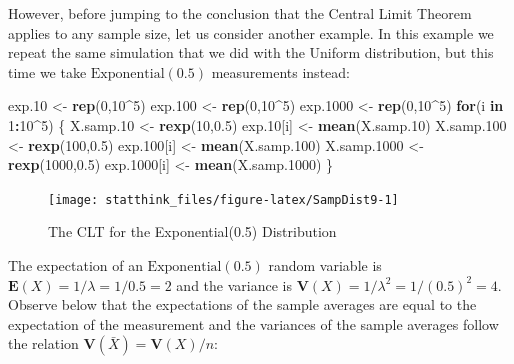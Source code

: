 \documentclass[
]{krantz}
\makeatletter
\newenvironment{Shaded}{\begin{snugshade}}{\end{snugshade}}
\newcommand{\ControlFlowTok}[1]{\textcolor[rgb]{0.13,0.29,0.53}{\textbf{#1}}}
\newcommand{\DecValTok}[1]{\textcolor[rgb]{0.00,0.00,0.81}{#1}}
\newcommand{\FloatTok}[1]{\textcolor[rgb]{0.00,0.00,0.81}{#1}}
\newcommand{\KeywordTok}[1]{\textcolor[rgb]{0.13,0.29,0.53}{\textbf{#1}}}
\newcommand{\NormalTok}[1]{#1}
\newcommand{\OperatorTok}[1]{\textcolor[rgb]{0.81,0.36,0.00}{\textbf{#1}}}
\newcommand{\StringTok}[1]{\textcolor[rgb]{0.31,0.60,0.02}{#1}}
\newcommand{\Expec}{\mathbf{E}}
\newcommand{\Var}{\mathbf{V}}
\newenvironment{kframe}{%
\medskip{}
\setlength{\fboxsep}{.8em}
 \def\at@end@of@kframe{}%
 \ifinner\ifhmode%
  \def\at@end@of@kframe{\end{minipage}}%
  \begin{minipage}{\columnwidth}%
 \fi\fi%
 \def\FrameCommand##1{\hskip\@totalleftmargin \hskip-\fboxsep
 \colorbox{shadecolor}{##1}\hskip-\fboxsep
     \hskip-\linewidth \hskip-\@totalleftmargin \hskip\columnwidth}%
 \MakeFramed {\advance\hsize-\width
   \@totalleftmargin\z@ \linewidth\hsize
   \@setminipage}}%
 {\par\unskip\endMakeFramed%
 \at@end@of@kframe}
\renewenvironment{Shaded}{\begin{kframe}}{\end{kframe}}
\theoremstyle{definition}
\theoremstyle{definition}
\theoremstyle{definition}
\theoremstyle{remark}
\makeatother
\begin{document}
However, before jumping to the conclusion that the Central Limit Theorem
applies to any sample size, let us consider another example. In this
example we repeat the same simulation that we did with the Uniform
distribution, but this time we take \(\mathrm{Exponential}(0.5)\)
measurements instead:

\begin{Shaded}
\begin{Highlighting}[]
\NormalTok{exp}\FloatTok{.10}\NormalTok{ <-}\StringTok{ }\KeywordTok{rep}\NormalTok{(}\DecValTok{0}\NormalTok{,}\DecValTok{10}\OperatorTok{^}\DecValTok{5}\NormalTok{)}
\NormalTok{exp}\FloatTok{.100}\NormalTok{ <-}\StringTok{ }\KeywordTok{rep}\NormalTok{(}\DecValTok{0}\NormalTok{,}\DecValTok{10}\OperatorTok{^}\DecValTok{5}\NormalTok{)}
\NormalTok{exp}\FloatTok{.1000}\NormalTok{ <-}\StringTok{ }\KeywordTok{rep}\NormalTok{(}\DecValTok{0}\NormalTok{,}\DecValTok{10}\OperatorTok{^}\DecValTok{5}\NormalTok{)}
\ControlFlowTok{for}\NormalTok{(i }\ControlFlowTok{in} \DecValTok{1}\OperatorTok{:}\DecValTok{10}\OperatorTok{^}\DecValTok{5}\NormalTok{) \{}
\NormalTok{  X.samp}\FloatTok{.10}\NormalTok{ <-}\StringTok{ }\KeywordTok{rexp}\NormalTok{(}\DecValTok{10}\NormalTok{,}\FloatTok{0.5}\NormalTok{)}
\NormalTok{  exp}\FloatTok{.10}\NormalTok{[i] <-}\StringTok{ }\KeywordTok{mean}\NormalTok{(X.samp}\FloatTok{.10}\NormalTok{)}
\NormalTok{  X.samp}\FloatTok{.100}\NormalTok{ <-}\StringTok{ }\KeywordTok{rexp}\NormalTok{(}\DecValTok{100}\NormalTok{,}\FloatTok{0.5}\NormalTok{)}
\NormalTok{  exp}\FloatTok{.100}\NormalTok{[i] <-}\StringTok{ }\KeywordTok{mean}\NormalTok{(X.samp}\FloatTok{.100}\NormalTok{)}
\NormalTok{  X.samp}\FloatTok{.1000}\NormalTok{ <-}\StringTok{ }\KeywordTok{rexp}\NormalTok{(}\DecValTok{1000}\NormalTok{,}\FloatTok{0.5}\NormalTok{)}
\NormalTok{  exp}\FloatTok{.1000}\NormalTok{[i] <-}\StringTok{ }\KeywordTok{mean}\NormalTok{(X.samp}\FloatTok{.1000}\NormalTok{)}
\NormalTok{\}}
\end{Highlighting}
\end{Shaded}

\begin{figure}

{\centering \texttt{[image: statthink\_files/figure-latex/SampDist9-1]} 

}

\caption{The CLT for the Exponential(0.5) Distribution}\label{fig:SampDist9}
\end{figure}

The expectation of an \(\mathrm{Exponential}(0.5)\) random variable is
\(\Expec(X) = 1/\lambda = 1/0.5 = 2\) and the variance is
\(\Var(X) = 1/\lambda^2 = 1/(0.5)^2 = 4\). Observe below that the
expectations of the sample averages are equal to the expectation of the
measurement and the variances of the sample averages follow the relation
\(\Var(\bar X) = \Var (X)/n\):
\end{document}
